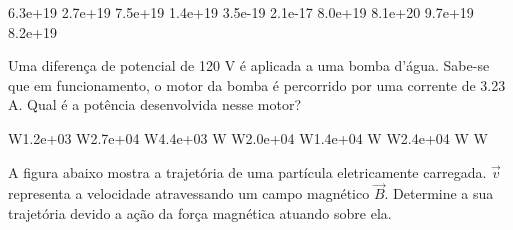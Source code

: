 \documentclass[12pt, addpoints]{exam}
\begin{document}
\begin{questions}
\begin{multicols*}{2}
\begin{oneparchoices}
\choice 6.3e+19 \choice 2.7e+19 \choice 7.5e+19 \choice 1.4e+19 \choice 3.5e-19 \choice 2.1e-17 \choice 8.0e+19 \choice 8.1e+20 \choice 9.7e+19 \choice 8.2e+19 
\end{oneparchoices}\question Uma diferença de potencial de 120 V é aplicada a uma bomba d’água. Sabe-se que em funcionamento, o motor da bomba é percorrido por uma corrente de    3.23 A. Qual é a potência desenvolvida nesse motor?

\begin{oneparchoices}
 W\choice 1.2e+03 W\choice 2.7e+04 W\choice 4.4e+03 W W\choice 2.0e+04 W\choice 1.4e+04 W W\choice 2.4e+04 W W
\end{oneparchoices}\question A ﬁgura abaixo mostra a trajetória de uma partícula eletricamente carregada. $\vec{{v}}$ representa a velocidade atravessando um campo magnético $\vec{{B}}$. Determine a sua trajetória devido a ação da força magnética atuando sobre ela.
        
        \begin{center}
            \begin{minipage}[c]{0.5\linewidth}
            \end{minipage}
        \end{center}

        


\end{multicols*}
\end{questions}
\end{document}
